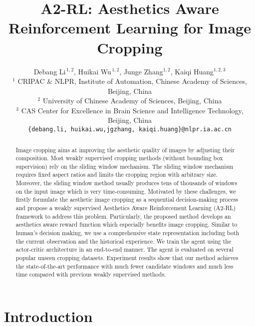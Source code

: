 \documentclass[10pt,twocolumn,letterpaper]{article}
\begin{document}
\title{A2-RL: Aesthetics Aware Reinforcement Learning for Image Cropping}

\author{Debang Li$^{\,1,2}$, Huikai Wu$^{\,1,2}$, Junge Zhang$^{1,2}$, Kaiqi Huang$^{1,2,3}$\\
$^{1}$ CRIPAC \& NLPR, Institute of Automation, Chinese Academy of Sciences, Beijing, China\\
$^{2}$ University of Chinese Academy of Sciences, Beijing, China\\
$^{3}$ CAS Center for Excellence in Brain Science and Intelligence Technology, Beijing, China\\
{\tt\small \{debang.li, huikai.wu,jgzhang, kaiqi.huang\}@nlpr.ia.ac.cn}
}

\maketitle
\thispagestyle{empty}

\begin{abstract}
Image cropping aims at improving the aesthetic quality of images by adjusting their composition. Most weakly supervised cropping methods (without bounding box supervision) rely on the sliding window mechanism. The sliding window mechanism requires fixed aspect ratios and limits the cropping region with arbitrary size. Moreover, the sliding window method usually produces tens of thousands of windows on the input image which is very time-consuming. Motivated by these challenges, we firstly formulate the aesthetic image cropping as a sequential decision-making process and propose a weakly supervised Aesthetics Aware Reinforcement Learning (A2-RL) framework to address this problem. Particularly, the proposed method develops an aesthetics aware reward function which especially benefits image cropping. Similar to human's decision making, we use a comprehensive state representation including both the current observation and the historical experience. We train the agent using the actor-critic architecture in an end-to-end manner. The agent is evaluated on several popular unseen cropping datasets. Experiment results show that our method achieves the state-of-the-art performance with much fewer candidate windows and much less time compared with previous weakly supervised methods.
\end{abstract}

\section{Introduction}
\end{document}
